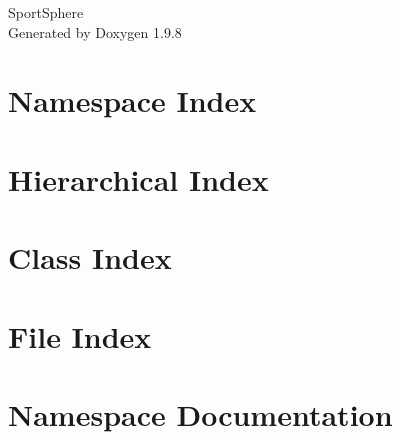 \documentclass[twoside]{book}
\newcommand{\+}{\discretionary{\mbox{\scriptsize$\hookleftarrow$}}{}{}}
\newcommand{\clearemptydoublepage}{%
    \newpage{\pagestyle{empty}\cleardoublepage}%
  }
\begin{document}
  \raggedbottom
    \hypersetup{pageanchor=false,
                bookmarksnumbered=true,
                pdfencoding=unicode
               }
  \begin{titlepage}
  \vspace*{7cm}
  \begin{center}%
  {\Large Sport\+Sphere}\\
  \vspace*{1cm}
  {\large Generated by Doxygen 1.9.8}\\
  \end{center}
  \end{titlepage}
  \clearemptydoublepage
  \tableofcontents
  \clearemptydoublepage
  \hypersetup{pageanchor=true}

\chapter{Namespace Index}

\chapter{Hierarchical Index}

\chapter{Class Index}

\chapter{File Index}

\chapter{Namespace Documentation}














\end{document}
